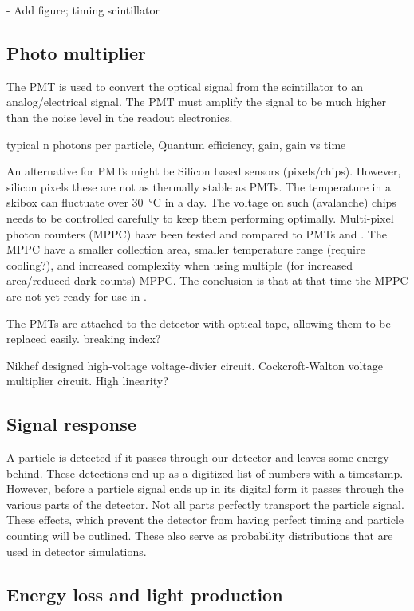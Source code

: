 - Add figure; timing scintillator


\subsection{Photo multiplier}

The PMT is used to convert the optical signal from the scintillator to an analog/electrical signal. The PMT must amplify the signal to be much higher than the noise level in the readout electronics.

typical n photons per particle, Quantum efficiency, gain, gain vs time

An alternative for PMTs might be Silicon based sensors (pixels/chips). However, silicon pixels these are not as thermally stable as PMTs. The temperature in a \hisparc skibox can fluctuate over \SI{30}{\degreeCelsius} in a day. The voltage on such (avalanche) chips needs to be controlled carefully to keep them performing optimally. Multi-pixel photon counters (MPPC) have been tested and compared to PMTs \cite[Chapter~3.4]{lio2011} and \cite[Chapter~3.6]{lio2010}. The MPPC have a smaller collection area, smaller temperature range (require cooling?), and increased complexity when using multiple (for increased area/reduced dark counts) MPPC. The conclusion is that at that time the MPPC are not yet ready for use in \hisparc.

The PMTs are attached to the detector with optical tape, allowing them to be replaced easily. breaking index?

Nikhef designed high-voltage voltage-divier circuit.
Cockcroft-Walton voltage multiplier circuit.
High linearity?


\subsection{Signal response}

A particle is detected if it passes through our detector and leaves some energy behind. These detections end up as a digitized list of numbers with a timestamp. However, before a particle signal ends up in its digital form it passes through the various parts of the detector. Not all parts perfectly transport the particle signal. These effects, which prevent the detector from having perfect timing and particle counting will be outlined. These also serve as probability distributions that are used in detector simulations.


\subsection{Energy loss and light production}

